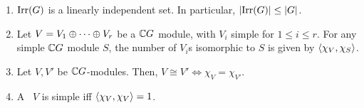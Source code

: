 \begin{boxproposition} \label{Ch2:Prop:Bhv_Irred_Char}
    \hfill
    \begin{enumerate}[label = \normalfont \arabic*., noitemsep]
        \item $\operatorname{Irr}\!\left( G \right)$ is a linearly independent set. In particular, $\left\lvert \operatorname{Irr}\!\left( G \right) \right\rvert \leq \left\lvert G \right\rvert$.
        
        \item Let $V = V_1 \oplus \cdots \oplus V_r$ be a $\mathbb{C} G$ module, with $V_i$ simple for $1 \leq i \leq r$. For any simple $\mathbb{C} G$ module $S$, the number of $V_i$s isomorphic to $S$ is given by $\left\langle \chi_V, \chi_S \right\rangle$.
        
        \item Let $V, V'$ be $\mathbb{C} G$-modules. Then, $V \cong V' \iff \chi_V = \chi_{V'}$.
        
        \item A \CGM\ $V$ is simple iff $\left\langle \chi_V, \chi_V \right\rangle = 1$.
    \end{enumerate}
\end{boxproposition}
